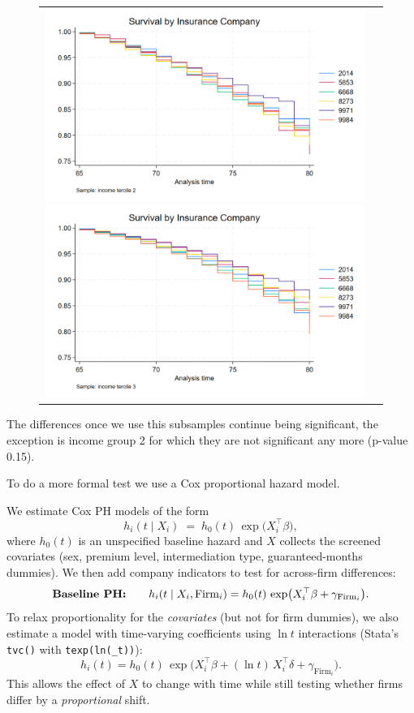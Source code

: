 \documentclass[12pt]{article}
\begin{document}
\begin{figure}[H]
\caption{}
\label{fig:ie6_2}
\centering{}%
\begin{tabular}{cc}
\includegraphics[scale=0.25]{../figures/IE6/IE6_survival_year_income2.png} \includegraphics[scale=0.25]{../figures/IE6/IE6_survival_year_income3.png} 
\end{tabular}
\end{figure}

The differences once we use this subsamples continue being significant, the exception is income group 2 for which they are not significant any more (p-value 0.15).

To do a more formal test we use a Cox proportional hazard model.


We estimate Cox PH models of the form
\[
h_i(t \mid X_i) \;=\; h_0(t)\,\exp\!\big( X_i^\top \beta \big),
\]
where \(h_0(t)\) is an unspecified baseline hazard and \(X\) collects the screened covariates (sex, premium level, intermediation type, guaranteed-months dummies). We then add company indicators to test for across-firm differences:
\[
\text{\bf Baseline PH:}\qquad
h_i(t \mid X_i,\text{Firm}_i)=h_0(t)\,\exp\!\big( X_i^\top \beta + \gamma_{\text{Firm}_i} \big).
\]
To relax proportionality for the \emph{covariates} (but not for firm dummies), we also estimate a model with time-varying coefficients using \(\ln t\) interactions (Stata’s \texttt{tvc()} with \texttt{texp(ln(\_t))}):
\[
h_i(t)=h_0(t)\,\exp\!\big( X_i^\top \beta + (\ln t)\,X_i^\top \delta + \gamma_{\text{Firm}_i} \big).
\]
This allows the effect of \(X\) to change with time while still testing whether firms differ by a \emph{proportional} shift.
\end{document}
